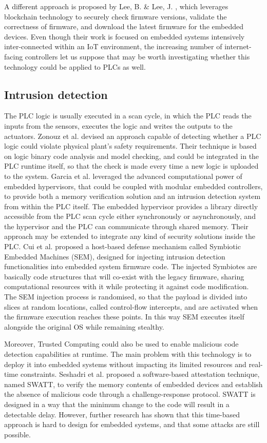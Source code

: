 A different approach is proposed by Lee, B. \& Lee, J. \cite{blockchain}, which leverages blockchain technology to securely check firmware versions,
validate the correctness of firmware, and download the latest firmware for the embedded devices.
Even though their work is focused on embedded systems intensively inter-connected within an IoT environment, the increasing number of internet-facing controllers
let us suppose that may be worth investigating whether this technology could be applied to PLCs as well. 


\subsection{Intrusion detection}

The PLC logic is usually executed in a scan cycle, in which the PLC reads the inputs from the sensors, executes the logic and writes the outputs to the actuators.
Zonouz et al. \cite{logic-analytics} devised an approach capable of detecting whether a PLC logic could violate physical plant's safety requirements.
Their technique is based on logic binary code analysis and model checking, and could be integrated in the PLC runtime itself, so that the check is made every time a new logic is
uploaded to the system.
Garcia et al. \cite{hypervisor-control} leveraged the advanced computational power of embedded hypervisors, that could be coupled with modular embedded controllers,
to provide both a memory verification solution and an intrusion detection system from within the PLC itself.
The embedded hypervisor provides a library directly accessible from the PLC scan cycle either synchronously or asynchronously,
and the hypervisor and the PLC can communicate through shared memory. Their approach may be extended to integrate any kind of security solutions inside the PLC.
Cui et al. \cite{symbiotes} proposed a host-based defense mechanism called Symbiotic Embedded Machines (SEM), designed for injecting
intrusion detection functionalities into embedded system firmware code. The injected Symbiotes are basically code structures that will co-exist
with the legacy firmware, sharing computational resources with it while protecting it against code modification.
The SEM injection process is randomised, so that the payload is divided into slices at random locations, called control-flow intercepts,
and are activated when the firmware execution reaches these points. In this way SEM executes itself alongside the original OS while remaining stealthy.

Moreover, Trusted Computing could also be used to enable malicious code detection capabilities at runtime. The main problem with this technology is to deploy it into
embedded systems without impacting its limited resources and real-time constraints. Seshadri et al. \cite{swatt} proposed a software-based attestation technique,
named SWATT, to verify the memory contents of embedded devices and establish the absence of malicious code through a challenge-response protocol.
SWATT is designed in a way that the minimum change to the code will result in a detectable delay. However, further research \cite{swatt-difficulty} has shown that
this time-based approach is hard to design for embedded systems, and that some attacks are still possible.

